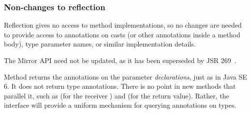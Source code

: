 \documentclass[10pt]{article}
\begin{document}
% 
% 
% 
% 



\subsubsection{Non-changes to reflection}

Reflection gives no access to method implementations, so no changes are
needed to
provide access to annotations on casts (or other annotations inside
a method body), type parameter names, or similar implementation details.


The Mirror API  need not be updated, as it has been
superseded by JSR 269~\cite{JSR269}.


Method  returns the annotations on
the parameter \emph{declarations}, just as in Java SE 6.  It does not return
type annotations.  There is no point in new methods that parallel it,
such as  (for the receiver
) and  (for the return
value).  Rather, the interface will provide a uniform mechanism for
querying annotations on types.
\end{document}
